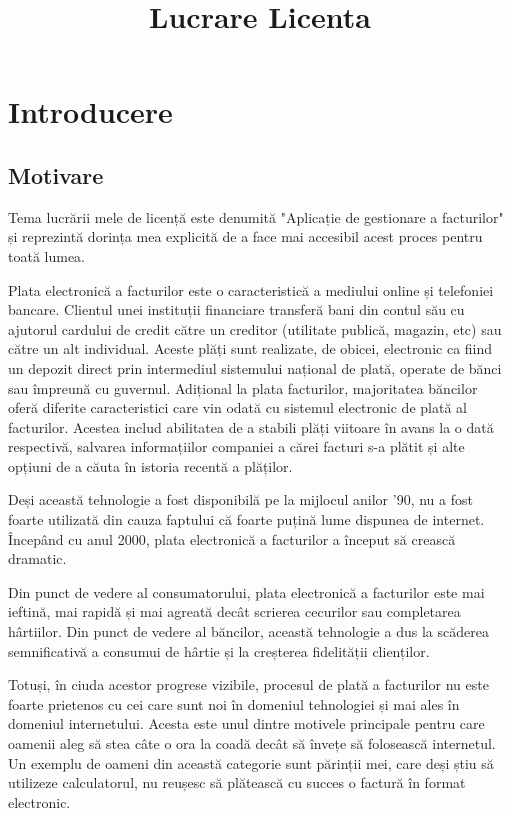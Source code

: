 \documentclass[12pt]{book}
\begin{document}
	
\title{Lucrare Licenta}
\maketitle
\tableofcontents
	
\chapter{Introducere}
\section{Motivare}
Tema lucrării mele de licență este denumită "Aplicație de gestionare a facturilor" și reprezintă dorința mea explicită de a face mai accesibil acest proces pentru toată lumea.

Plata electronică a facturilor este o caracteristică a mediului online și telefoniei bancare. Clientul unei instituții financiare transferă bani din contul său cu ajutorul cardului de credit către un creditor (utilitate publică, magazin, etc) sau către un alt individual. Aceste plăți sunt realizate, de obicei, electronic ca fiind un depozit direct prin intermediul sistemului național de plată, operate de bănci sau împreună cu guvernul. Adițional la plata facturilor, majoritatea băncilor oferă diferite caracteristici care vin odată cu sistemul electronic de plată al facturilor. Acestea includ abilitatea de a stabili plăți viitoare în avans la o dată respectivă, salvarea informațiilor companiei a cărei facturi s-a plătit și alte opțiuni de a căuta în istoria recentă a plăților. 

Deși această tehnologie a fost disponibilă pe la mijlocul anilor  '90, nu a fost foarte utilizată din cauza faptului că foarte puțină lume dispunea de internet. Începând cu anul 2000, plata electronică a facturilor a început să crească dramatic. 

Din punct de vedere al consumatorului, plata electronică a facturilor este mai ieftină, mai rapidă și mai agreată decât scrierea cecurilor sau completarea hârtiilor. Din punct de vedere al băncilor, această tehnologie a dus la scăderea semnificativă a consumui de hârtie și la creșterea fidelității clienților.

Totuși, în ciuda acestor progrese vizibile, procesul de plată a facturilor nu este foarte prietenos cu cei care sunt noi în domeniul tehnologiei și mai ales în domeniul internetului. Acesta este unul dintre motivele principale pentru care oamenii aleg să stea câte o ora la coadă decât să învețe să folosească internetul. Un exemplu de oameni din această categorie sunt părinții mei, care deși știu să utilizeze calculatorul, nu reușesc să plătească cu succes o factură în format electronic. 
\end{document}
